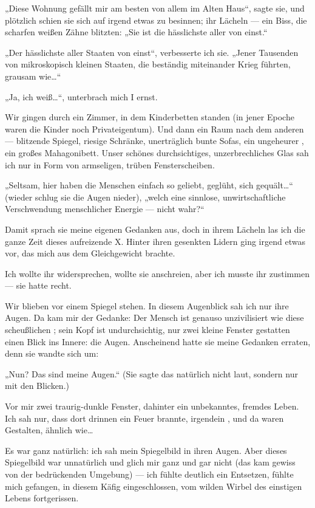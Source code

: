 „Diese Wohnung gefällt mir am besten von allem im Alten Haus“,
sagte sie, und plötzlich schien sie sich auf irgend etwas zu
besinnen; ihr Lächeln — ein Biss, die scharfen weißen Zähne
blitzten: „Sie ist die hässlichste aller  von einst.“

„Der hässlichste aller Staaten von einst“, verbesserte ich sie.
„Jener Tausenden von mikroskopisch kleinen Staaten, die beständig
miteinander Krieg führten, grausam wie\ldots{}“

„Ja, ich weiß\ldots{}“, unterbrach mich I ernst.

Wir gingen durch ein
Zimmer, in dem Kinderbetten standen (in jener Epoche waren die
Kinder noch Privateigentum). Und dann ein Raum nach dem anderen —
blitzende Spiegel, riesige Schränke, unerträglich bunte Sofas, ein
ungeheurer , ein großes Mahagonibett. Unser schönes
durchsichtiges, unzerbrechliches Glas sah ich nur in Form von
armseligen, trüben Fensterscheiben.

„Seltsam, hier haben die
Menschen \glq{}einfach so\grq{} geliebt, geglüht, sich
gequält\ldots{}“ (wieder schlug sie die Augen nieder), „welch eine
sinnlose, unwirtschaftliche Verschwendung menschlicher Energie —
nicht wahr?“

Damit sprach sie meine eigenen Gedanken aus, doch in
ihrem Lächeln las ich die ganze Zeit dieses aufreizende X. Hinter
ihren gesenkten Lidern ging irgend etwas vor, das mich aus dem
Gleichgewicht brachte.

Ich wollte ihr widersprechen, wollte sie anschreien, aber ich
musste ihr zustimmen — sie hatte recht.

Wir blieben vor einem
Spiegel stehen. In diesem Augenblick sah ich nur ihre Augen. Da kam
mir der Gedanke: Der Mensch ist genauso unzivilisiert wie diese
scheußlichen ; sein Kopf ist undurchsichtig, nur zwei
kleine Fenster gestatten einen Blick ins Innere: die Augen.
Anscheinend hatte sie meine Gedanken erraten, denn sie wandte sich
um:

„Nun? Das sind meine Augen.“ (Sie sagte das natürlich nicht laut,
sondern nur mit den Blicken.)

Vor mir zwei traurig-dunkle Fenster,
dahinter ein unbekanntes, fremdes Leben. Ich sah nur, dass dort
drinnen ein Feuer brannte, irgendein , und da waren Gestalten,
ähnlich wie\ldots{}

Es war ganz natürlich: ich sah mein Spiegelbild in ihren Augen.
Aber dieses Spiegelbild war unnatürlich und glich mir ganz und gar
nicht (das kam gewiss von der bedrückenden Umgebung) — ich fühlte
deutlich ein Entsetzen, fühlte mich gefangen, in diesem Käfig
eingeschlossen, vom wilden Wirbel des einstigen Lebens
fortgerissen.

